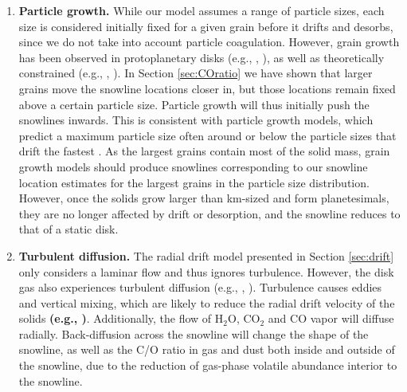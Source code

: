 \documentclass[apj]{emulateapj}
\begin{document}
\begin{enumerate}
\item \textbf{Particle growth.} While our model assumes a range of particle sizes, each size is considered initially fixed for a given grain before it drifts and desorbs, since we do not take into account particle coagulation. However, grain growth has been observed in protoplanetary disks (e.g., \citealt{ricci10}, \citealt{perez12}), as well as theoretically constrained (e.g., \citealt{birnstiel10}, \citealt{birnstiel12}). In Section \ref{sec:COratio} we have shown that larger grains move the snowline locations closer in, but those locations remain fixed above a certain particle size. Particle growth will thus initially push the snowlines inwards. This is consistent with particle growth models, which predict a maximum particle size often around or below the particle sizes that drift the fastest \citep{birnstiel12}. As the largest grains contain most of the solid mass, grain growth models should produce snowlines corresponding to our snowline location estimates for the largest grains in the particle size distribution. However, once the solids grow larger than km-sized and form planetesimals, they are no longer affected by drift or desorption, and the snowline reduces to that of a static disk. %

\item \textbf{Turbulent diffusion.} The radial drift model presented in Section \ref{sec:drift} only considers a laminar flow and thus ignores turbulence. However, the disk gas also experiences turbulent diffusion (e.g., \citealt{birnstiel12}, \citealt{alidib14}). Turbulence causes eddies and vertical mixing, which are likely to reduce the radial drift velocity of the solids \textbf{(e.g., \citealt{youdin07})}. Additionally, the flow of H$_2$O, CO$_2$ and CO vapor will diffuse radially. Back-diffusion across the snowline will change the shape of the snowline, as well as the C/O ratio in gas and dust both inside and outside of the snowline, due to the reduction of gas-phase volatile abundance interior to the snowline. 


\end{enumerate}
\end{document}
